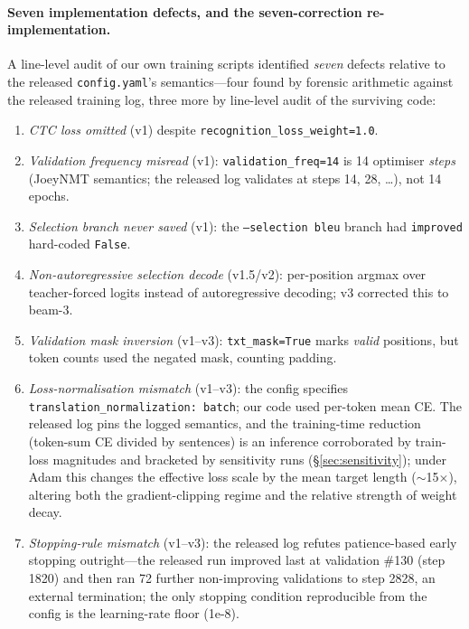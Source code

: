 \documentclass[pdflatex,sn-chicago]{sn-jnl}
\begin{document}
\paragraph{Seven implementation defects, and the seven-correction re-implementation.}
\label{sec:protocol_robustness}
\label{sec:faithful_v4}
A line-level audit of our own training scripts identified \emph{seven} defects relative to the released \texttt{config.yaml}'s semantics---four found by forensic arithmetic against the released training log, three more by line-level audit of the surviving code:
\begin{enumerate}\itemsep0pt
\item \emph{CTC loss omitted} (v1) despite \texttt{recognition\_loss\_weight=1.0}.
\item \emph{Validation frequency misread} (v1): \texttt{validation\_freq=14} is 14 optimiser \emph{steps} (JoeyNMT semantics; the released log validates at steps 14, 28, \ldots), not 14 epochs.
\item \emph{Selection branch never saved} (v1): the \texttt{--selection bleu} branch had \texttt{improved} hard-coded \texttt{False}.
\item \emph{Non-autoregressive selection decode} (v1.5/v2): per-position argmax over teacher-forced logits instead of autoregressive decoding; v3 corrected this to beam-3.
\item \emph{Validation mask inversion} (v1--v3): \texttt{txt\_mask=True} marks \emph{valid} positions, but token counts used the negated mask, counting padding.
\item \emph{Loss-normalisation mismatch} (v1--v3): the config specifies \texttt{translation\_normalization: batch}; our code used per-token mean CE. The released log pins the logged semantics, and the training-time reduction (token-sum CE divided by sentences) is an inference corroborated by train-loss magnitudes and bracketed by sensitivity runs (\S\ref{sec:sensitivity}); under Adam this changes the effective loss scale by the mean target length ($\sim$15$\times$), altering both the gradient-clipping regime and the relative strength of weight decay.
\item \emph{Stopping-rule mismatch} (v1--v3): the released log refutes patience-based early stopping outright---the released run improved last at validation \#130 (step 1820) and then ran 72 further non-improving validations to step 2828, an external termination; the only stopping condition reproducible from the config is the learning-rate floor (1e-8).
\end{enumerate}
\end{document}
